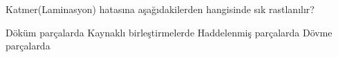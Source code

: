 \begin{question}[subtitle=]
  Katmer(Laminasyon) hatasına aşağıdakilerden hangisinde sık rastlanılır?
  \begin{tasks}
    \task Döküm parçalarda
    \task Kaynaklı birleştirmelerde
    \task Haddelenmiş parçalarda \correct
    \task Dövme parçalarda
  \end{tasks}
\end{question}
\begin{solution}
	\correct
\end{solution}


